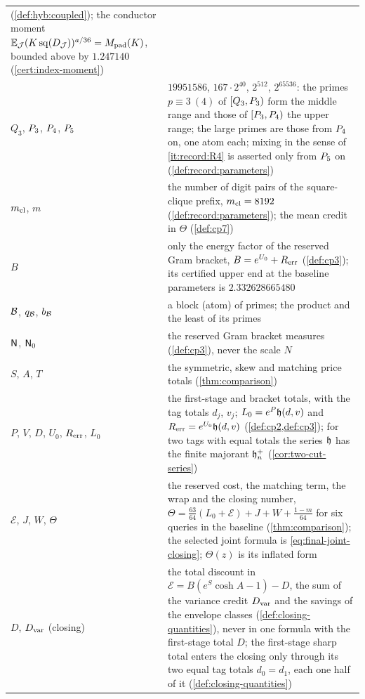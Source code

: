 \begin{longtable}{@{}>{\raggedright\arraybackslash}p{}%
>{\raggedright\arraybackslash}p{}@{}}
 (\cref{def:hyb:coupled}); the conductor moment
 $\mathbb E_\mathcal J(K\operatorname{sq}(D_\mathcal J))^{a/36}=M_{\rm pad}(K)$,
 bounded above by $1.247140$ (\cref{cert:index-moment})\\
$Q_3$, $P_3$, $P_4$, $P_5$ & $19951586$, $167\cdot2^{40}$, $2^{512}$,
 $2^{65536}$: the primes $p\equiv3\ (4)$ of $[Q_3,P_3)$ form the middle
 range and those of $[P_3,P_4)$ the upper range; the large primes are those from $P_4$ on, one atom each; mixing in
 the sense of \ref{it:record:R4} is asserted only from $P_5$ on
 (\cref{def:record:parameters})\\
$m_{\mathrm{cl}}$, $m$ & the number of digit pairs of the square-clique prefix,
 $m_{\mathrm{cl}}=8192$ (\cref{def:record:parameters}); the mean credit in $\Theta$
 (\cref{def:cp7})\\
$B$ & only the energy factor of the reserved Gram bracket,
 $B=e^{U_0}+R_{\rm err}$ (\cref{def:cp3}); its certified upper end at the
 baseline parameters is $2.332628665480$\\
$\mathcal B$, $q_\mathcal B$, $b_\mathcal B$ & a block (atom) of primes; the product and the
 least of its primes\\
$\mathsf N$, $\mathsf N_0$ & the reserved Gram bracket measures (\cref{def:cp3}), never
 the scale $N$\\
$S$, $A$, $T$ & the symmetric, skew and matching price totals
 (\cref{thm:comparison})\\
$P$, $V$, $D$, $U_0$, $R_{\rm err}$, $L_0$ & the first-stage and bracket
 totals, with the tag totals $d_j$, $v_j$; $L_0=e^P\mathfrak h(d,v)$ and
 $R_{\rm err}=e^{U_0}\mathfrak h(d,v)$ (\cref{def:cp2,def:cp3}); for two tags with
 equal totals the series $\mathfrak h$ has the finite majorant $\mathfrak h_n^+$
 (\cref{cor:two-cut-series})\\
$\mathcal E$, $J$, $W$, $\Theta$ & the reserved cost, the matching term, the
 wrap and the closing number,
 $\Theta=\frac{63}{64}(L_0+\mathcal E)+J+W+\frac{1-m}{64}$ for six queries
 in the baseline (\cref{thm:comparison}); the selected joint formula is
 \eqref{eq:final-joint-closing}; $\Theta(z)$ is its inflated form\\
$D$, $D_{\rm var}$ (closing) & the total discount in
 $\mathcal E=B(e^S\cosh A-1)-D$, the sum of the variance credit $D_{\rm var}$
 and the savings of the envelope classes (\cref{def:closing-quantities}),
 never in one formula with the first-stage total $D$; the first-stage sharp
 total enters the closing only through its two equal tag totals $d_0=d_1$,
 each one half of it (\cref{def:closing-quantities})\\

\end{longtable}
